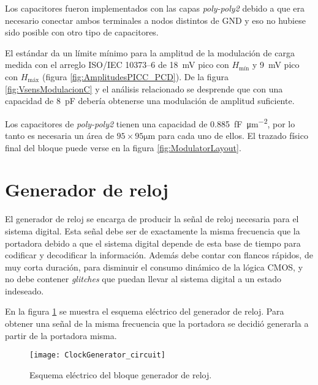 Los capacitores fueron implementados con las capas \emph{poly-poly2} 
debido a que era necesario conectar ambos terminales a nodos 
distintos de GND y eso no hubiese sido posible con otro tipo de 
capacitores.

El estándar da un límite mínimo para la amplitud de la modulación de 
carga medida con el arreglo ISO/IEC 10373--6 de \SI{18}{\milli\volt} 
pico con \(H_{\text{mín}}\) y \SI{9}{\milli\volt} pico con \(
H_{\text{máx}}\) (figura \ref{fig:AmplitudesPICC_PCD}). De la figura 
\ref{fig:VsensModulacionC} y el análisis relacionado se desprende que
con una capacidad de \SI{8}{\pico\farad} debería obtenerse una 
modulación de amplitud suficiente. 

Los capacitores de \emph{poly-poly2} tienen una capacidad de 
\SI[per-mode=symbol]{0.885}{\femto\farad\per\micro\meter\squared}, por 
lo tanto es necesaria un área de \(95\times95\si{\micro\meter}\) para 
cada uno de ellos. El trazado físico final del bloque puede verse en la 
figura \ref{fig:ModulatorLayout}.


\section{Generador de reloj}

El generador de reloj se encarga de producir la señal de reloj 
necesaria para el sistema digital. Esta señal debe ser de exactamente 
la misma frecuencia que la portadora debido a que el sistema digital 
depende de esta base de tiempo para codificar y decodificar la 
información. Además debe contar con flancos rápidos, de muy corta 
duración, para disminuir el consumo dinámico de la lógica CMOS, y no 
debe contener \emph{glitches} que puedan llevar al sistema digital a 
un estado indeseado.

En la figura \ref{fig:ClockGeneratorCircuit} se muestra el esquema 
eléctrico del generador de reloj. Para obtener una señal de la misma 
frecuencia que la portadora se decidió generarla a partir de la 
portadora misma. 

\begin{figure}
	\centering
	\texttt{[image: ClockGenerator\_circuit]}
	\caption{Esquema eléctrico del bloque generador de reloj.}
	\label{fig:ClockGeneratorCircuit}
\end{figure}


